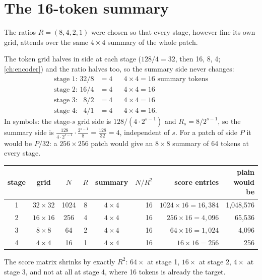 \section{The 16-token summary}\label{sec:esa:sixteen}

\begin{keypoint}
The ratios $R = (8, 4, 2, 1)$ were chosen so that every stage, however fine its own grid, attends
over the same $4\times4$ summary of the whole patch.
\end{keypoint}

The token grid halves in side at each stage ($128/4 = 32$, then 16, 8, 4; \cref{ch:encoder}) and
the ratio halves too, so the summary side never changes:
\begin{align*}
  \text{stage 1: } 32/8 &= 4 && 4\times4 = 16 \text{ summary tokens}\\
  \text{stage 2: } 16/4 &= 4 && 4\times4 = 16\\
  \text{stage 3: } \phantom{1}8/2 &= 4 && 4\times4 = 16\\
  \text{stage 4: } \phantom{1}4/1 &= 4 && 4\times4 = 16 .
\end{align*}
In symbols: the stage-$s$ grid side is $128/(4\cdot2^{s-1})$ and $R_s = 8/2^{s-1}$, so the summary
side is $\frac{128}{4\cdot2^{s-1}}\cdot\frac{2^{s-1}}{8} = \frac{128}{32} = 4$, independent of $s$.
For a patch of side $P$ it would be $P/32$: a $256\times256$ patch would give an $8\times8$ summary
of 64 tokens at every stage.

\begin{center}
\begin{tabular}{cccccrrr}
\toprule
stage & grid & $N$ & $R$ & summary & $N/R^2$ & score entries & plain would be\\
\midrule
1 & $32\times32$ & 1024 & 8 & $4\times4$ & 16 & $1024\times16 = 16{,}384$ & 1{,}048{,}576\\
2 & $16\times16$ & 256 & 4 & $4\times4$ & 16 & $256\times16 = 4{,}096$ & 65{,}536\\
3 & $8\times8$ & 64 & 2 & $4\times4$ & 16 & $64\times16 = 1{,}024$ & 4{,}096\\
4 & $4\times4$ & 16 & 1 & $4\times4$ & 16 & $16\times16 = 256$ & 256\\
\bottomrule
\end{tabular}
\end{center}
The score matrix shrinks by exactly $R^2$: $64\times$ at stage 1, $16\times$ at stage 2, $4\times$
at stage 3, and not at all at stage 4, where 16 tokens is already the target.


